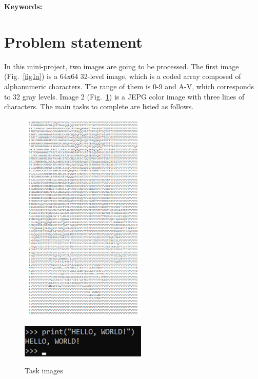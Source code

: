 \documentclass[hyperref]{article}
\theoremstyle{nonumberplain}
\begin{document}
	\vspace{1ex}
	{\noindent\small{\bf Keywords:}
		}
	
	\newpage
	
	\tableofcontents
	\newpage
	
	\section{Problem statement}

	
	\hspace{1.0em}
	
	In this mini-project, two images are going to be processed. The first image (Fig.~\ref{fig1a}) is a 64x64 32-level image, which is a coded array composed of alphanumeric characters. The range of them is 0-9 and A-V, which corresponds to 32 gray levels. Image 2 (Fig.~\ref{fig1b}) is a JEPG color image with three lines of characters. The main tasks to complete are listed as follows.
	
	\begin{figure}[htbp]
		\centering
		\begin{minipage}[t]{0.48\textwidth}
			\centering
			\includegraphics[width=6cm]{fig1.png}
			\label{fig1a}
		\end{minipage}
		\begin{minipage}[t]{0.48\textwidth}
			\centering
			\includegraphics[width=6cm]{fig2.png}
			\label{fig1b}
		\end{minipage}
		\caption{Task images}
	\end{figure}
	
\end{document}
